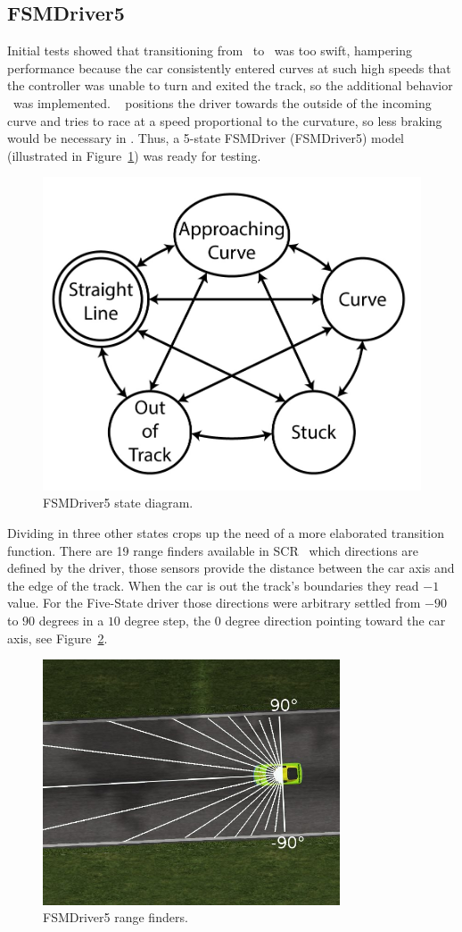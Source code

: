 \subsection{FSMDriver5}

Initial tests showed that transitioning from \SL~to \C~was too swift, hampering performance because the car consistently entered curves at such high speeds that the controller was unable to turn and exited the track, so the additional behavior \AC~was implemented. \AC~ positions the driver towards the outside of the incoming curve and tries to race at a speed proportional to the curvature, so less braking would be necessary in \C. Thus, a 5-state FSMDriver (FSMDriver5) model (illustrated in Figure~\ref{Fig:FSM5Diagram}) was ready for testing.

\begin{figure}[h]
	\centering
	\includegraphics[width=.45\textwidth]{FiveStateFSM}
	\caption{FSMDriver5 state diagram.}
	\label{Fig:FSM5Diagram}
\end{figure}


%
Dividing  in three other states crops up the need of a more elaborated transition function. There are 19 range finders available in SCR~\cite{SCR} which directions are defined by the driver, those sensors provide the distance between the car axis and the edge of the track. When the car is out the track's boundaries they read $-1$ value. For the Five-State driver those directions were arbitrary settled from $-90$ to $90$ degrees in a $10$ degree step, the $0$ degree direction pointing toward the car axis, see Figure~\ref{Fig:FSM5Sensors}.

\begin{figure}[h]
	\centering
	\includegraphics[width=250pt]{FSM5Sensors}
	\caption{FSMDriver5 range finders.}
	\label{Fig:FSM5Sensors}
\end{figure}

